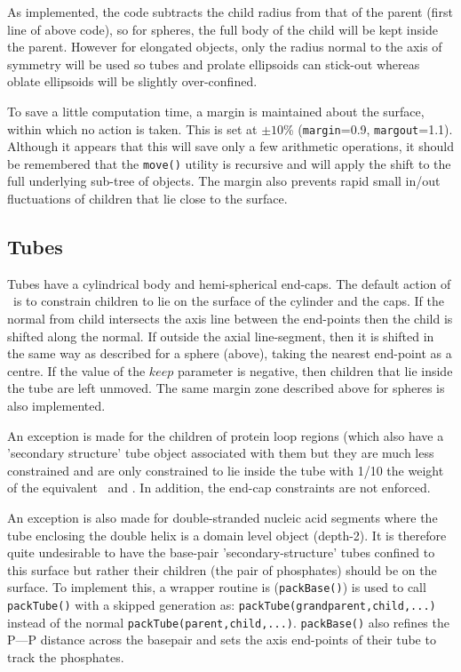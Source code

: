 As implemented, the code subtracts the child radius from that of the parent (first line of above code),
so for spheres, the full body of the child will be kept inside the parent.  However for elongated objects,
only the radius normal to the axis of symmetry will be used so tubes and prolate ellipsoids can stick-out
whereas oblate ellipsoids will be slightly over-confined.

To save a little computation time, a margin is maintained about the surface, within which no action is
taken.  This is set at $\pm10$\% ({\tt margin}=0.9, {\tt margout}=1.1).   Although it appears that this
will save only a few arithmetic operations, it should be remembered that the {\tt move()} utility
is recursive and will apply the shift to the full underlying sub-tree of objects.
The margin also prevents rapid small in/out fluctuations of children that lie close to the surface.

\subsection{Tubes}

Tubes have a cylindrical body and hemi-spherical end-caps.  The default action of \NAME\ is to constrain
children to lie on the surface of the cylinder and the caps.   If the normal from child intersects the axis
line between the end-points then the child is shifted along the normal.  If outside the axial line-segment,
then it is shifted in the same way as described for a sphere (above), taking the nearest end-point as a
centre.  If the value of the $keep$ parameter is negative, then children that lie inside the tube are left
unmoved.  The same margin zone described above for spheres is also implemented.

An exception is made for the children of protein loop regions (which also have a 'secondary structure'
tube object associated with them but they are much less constrained and are only constrained to lie
inside the tube with 1/10 the weight of the equivalent \AH\ and \Bs.   In addition, the end-cap
constraints are not enforced.

An exception is also made for double-stranded nucleic acid segments where the tube enclosing the
double helix is a domain level object (depth-2).   It is therefore quite undesirable to have the
base-pair 'secondary-structure' tubes confined to this surface but rather their children (the pair
of phosphates) should be on the surface.  To implement this, a wrapper routine is ({\tt packBase()})
is used to call {\tt packTube()} with a skipped generation as: {\tt packTube(grandparent,child,...)}
instead of the normal {\tt packTube(parent,child,...)}.  {\tt packBase()} also refines the P---P
distance across the basepair and sets the axis end-points of their tube to track the phosphates.

